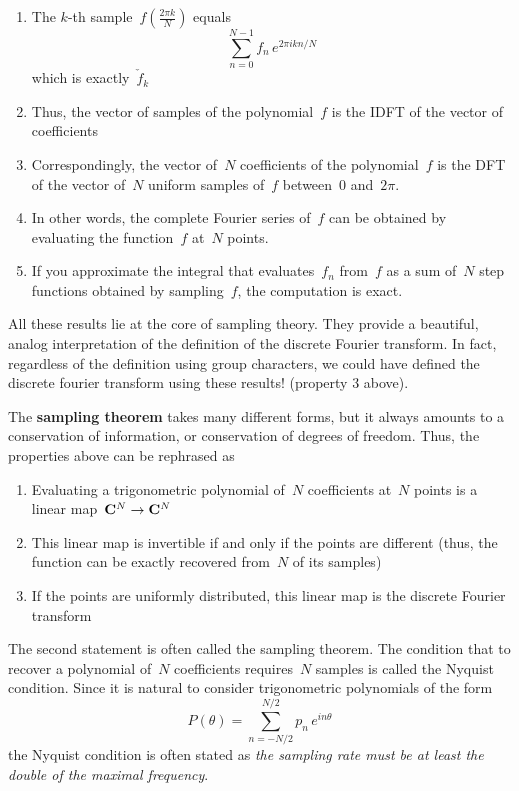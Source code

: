 \begin{enumerate}
	\item The $k$-th sample~$f\left(\frac{2\pi k}{N}\right)$ equals
		$$
		\sum_{n=0}^{N-1}f_n\,e^{2\pi ikn/N}
		$$
		which is exactly~$\check{f}_k$
	\item Thus, the vector of samples of the polynomial~$f$ is the
		IDFT of the vector of coefficients
	\item Correspondingly, the vector of~$N$ coefficients of the
		polynomial~$f$ is the DFT of the vector of~$N$ uniform samples
		of~$f$ between~$0$ and~$2\pi$.
	\item In other words, the complete Fourier series of~$f$ can be
		obtained by evaluating the function~$f$ at~$N$ points.
	\item If you approximate the integral that evaluates~$f_n$
		from~$f$ as a sum of~$N$ step functions obtained by
		sampling~$f$, the computation is exact.
\end{enumerate}

All these results lie at the core of sampling theory.
They provide a beautiful, analog interpretation of the definition of
the discrete Fourier transform.  In fact, regardless of the
definition using group characters, we could have defined the discrete
fourier transform using these results! (property 3 above).

The {\bf sampling theorem} takes many different forms, but it always
amounts to a conservation of information, or conservation of degrees of
freedom.  Thus, the properties above can be rephrased as
\begin{enumerate}
	\item Evaluating a trigonometric polynomial of~$N$ coefficients
		at~$N$ points is a linear map~$\mathbf{C}^N\to\mathbf{C}^N$
	\item This linear map is invertible if and only if the points are different
		(thus, the function can be exactly recovered from~$N$ of its samples)
	\item If the points are uniformly distributed, this linear map is
		the discrete Fourier transform
\end{enumerate}

The second statement is often called the sampling theorem.  The
condition that to recover a polynomial of~$N$ coefficients
requires~$N$ samples is called the Nyquist condition.  Since
it is natural to consider trigonometric polynomials of the form
$$
P(\theta)=\sum_{n=-N/2}^{N/2} p_n\,e^{in\theta}
$$
the Nyquist condition is often stated as \emph{the sampling rate must
be at least the double of the maximal frequency}.

